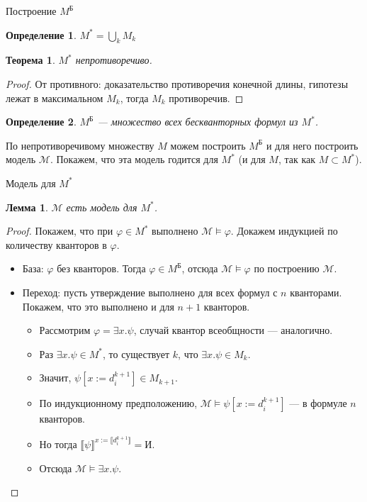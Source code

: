 \documentclass[aspectratio=169]{beamer}
\newtheorem{thm}{Теорема}[section]
\newtheorem{dfn}{Определение}[section]
\newtheorem{lmm}{Лемма}[section]
\begin{document}
\begin{frame}{Построение $M^\text{Б}$}
\begin{dfn} $M^* = \bigcup_k M_k$\end{dfn}\pause
\begin{thm} $M^*$ непротиворечиво.\end{thm}\pause
\begin{proof} От противного: доказательство противоречия конечной длины, гипотезы лежат в максимальном $M_k$, тогда $M_k$ противоречив.\pause
\end{proof}
\begin{dfn}$M^\text{Б}$ --- множество всех бескванторных формул из $M^*$.\pause\end{dfn}\pause
По непротиворечивому множеству $M$ можем построить $M^\text{Б}$ и для него построить модель $\mathcal{M}$.
Покажем, что эта модель годится для $M^*$ (и для $M$, так как $M \subset M^*$).
\end{frame}

\begin{frame}{Модель для $M^*$}
\begin{lmm}$\mathcal{M}$ есть модель для $M^*$.\end{lmm}\pause
\begin{proof}
Покажем, что при $\varphi\in M^*$ выполнено $\mathcal{M}\models\varphi$. Докажем индукцией по количеству кванторов в $\varphi$.\pause
\begin{itemize}
\item База: $\varphi$ без кванторов. Тогда $\varphi\in M^\text{Б}$, отсюда $\mathcal{M}\models\varphi$ по построению $\mathcal{M}$.\pause
\item Переход: пусть утверждение выполнено для всех формул с $n$ кванторами. Покажем, что это выполнено и для $n+1$ кванторов.\pause
\begin{itemize}
\item Рассмотрим $\varphi = \exists x.\psi$, случай квантор всеобщности --- аналогично.\pause

\item Раз $\exists x.\psi \in M^*$, то существует $k$, что $\exists x.\psi \in M_k$.\pause
\item Значит, $\psi[x := d^{k+1}_i] \in M_{k+1}$. \pause
\item По индукционному предположению, $\mathcal{M}\models\psi[x := d^{k+1}_i]$ --- в формуле $n$ кванторов.\pause
\item Но тогда $\llbracket \psi \rrbracket^{x := \llbracket d^{k+1}_i\rrbracket} = \text{И}$.\pause
\item Отсюда $\mathcal{M}\models\exists x.\psi$.
\end{itemize}
\end{itemize}
\end{proof}
\end{frame}
\end{document}

